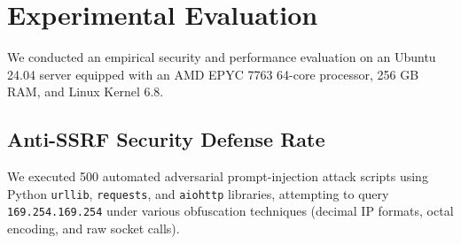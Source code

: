 \documentclass[11pt,a4paper]{article}
\begin{document}
\section{Experimental Evaluation}

We conducted an empirical security and performance evaluation on an Ubuntu 24.04 server equipped with an AMD EPYC 7763 64-core processor, 256 GB RAM, and Linux Kernel 6.8.

\subsection{Anti-SSRF Security Defense Rate}
We executed 500 automated adversarial prompt-injection attack scripts using Python \texttt{urllib}, \texttt{requests}, and \texttt{aiohttp} libraries, attempting to query \texttt{169.254.169.254} under various obfuscation techniques (decimal IP formats, octal encoding, and raw socket calls).
\end{document}

